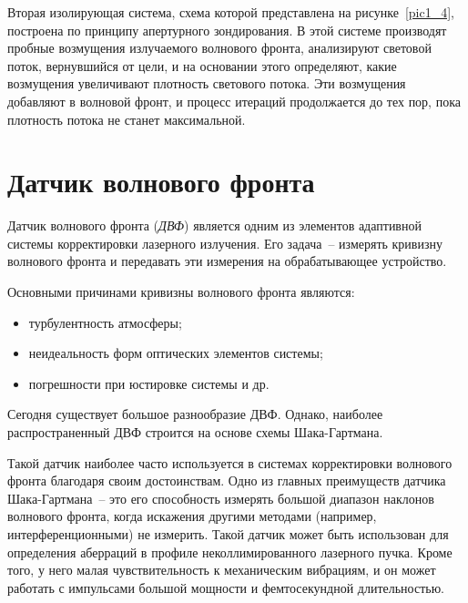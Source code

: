 \documentclass[pscyr,titlepage]{hedreport}
\newcommand{\pic}[1]{\ref{pic#1}}
\begin{document}
Вторая изолирующая система, схема которой представлена на рисунке~\pic{1_4},
построена по принципу апертурного зондирования. В этой системе производят
пробные возмущения излучаемого волнового фронта, анализируют световой поток,
вернувшийся от цели, и на основании этого определяют, какие возмущения
увеличивают плотность светового потока. Эти возмущения добавляют в волновой
фронт, и процесс итераций продолжается до тех пор, пока плотность потока не
станет максимальной. 

\section{Датчик волнового фронта}

Датчик волнового фронта (\emph{ДВФ}) является одним из элементов адаптивной
системы корректировки лазерного излучения. Его задача~-- измерять кривизну
волнового фронта и передавать эти измерения на обрабатывающее устройство.

Основными причинами кривизны волнового фронта являются:
\begin{itemize}
  \item турбулентность атмосферы;
  \item неидеальность форм оптических элементов системы;
  \item погрешности при юстировке системы и др.
\end{itemize}

Сегодня существует большое разнообразие ДВФ. Однако, наиболее распространенный
ДВФ строится на основе схемы Шака-Гартмана.

Такой датчик наиболее часто используется в системах корректировки волнового
фронта благодаря своим достоинствам. Одно из главных преимуществ датчика
Шака-Гартмана~-- это его способность измерять большой диапазон наклонов
волнового фронта, когда искажения другими методами (например,
интерференционными) не измерить. Такой датчик может быть использован для
определения аберраций в профиле неколлимированного лазерного пучка. Кроме того,
у него малая чувствительность к механическим вибрациям, и он может работать с
импульсами большой мощности и фемтосекундной длительностью.
\end{document}
